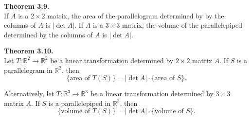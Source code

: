 \documentclass[10pt]{book}
\newcommand{\boxcolor}{gray!30}
\newenvironment{boxthm}{\begin{mdframed}[backgroundcolor=\boxcolor,nobreak=true]}{\end{mdframed}}
\theoremstyle{definition}
\begin{document}
\newpage

\begin{boxthm}
	\textbf{Theorem 3.9.} \\
	If $A$ is a $2 \times 2$ matrix, the area of the parallelogram determined by by the columns of $A$ is $|\det A|$. If $A$ is a $3 \times 3$ matrix, the volume of the parallelepiped determined by the columns of $A$ is $|\det A|$.
\end{boxthm}

\begin{boxthm}
	\textbf{Theorem 3.10.} \\
	Let $T: \mathbb{R}^2 \rightarrow \mathbb{R}^2$ be a linear transformation determined by $2 \times 2$ matrix $A$. If $S$ is a parallelogram in $\mathbb{R}^2$, then $$\{ \text{area of } T(S)\} = |\det A| \cdot \{ \text{area of } S \}.$$
	
	Alternatively, let $T: \mathbb{R}^3 \rightarrow \mathbb{R}^3$ be a linear transformation determined by $3 \times 3$ matrix $A$. If $S$ is a parallelepiped in $\mathbb{R}^3$, then $$\{ \text{volume of } T(S)\} = |\det A| \cdot \{ \text{volume of } S \}.$$
\end{boxthm}
\end{document}
